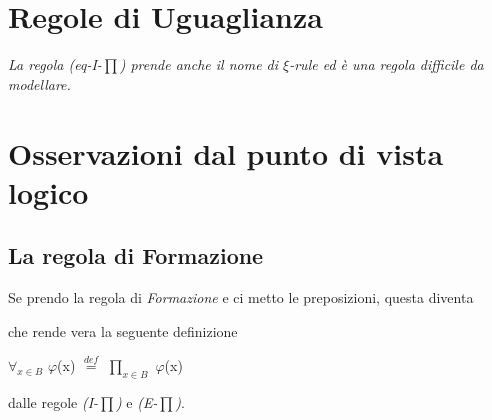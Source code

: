 \section{Regole di Uguaglianza}
\label{sec: uguaglianza-prodottop-dip}
\begin{prooftree}
\end{prooftree}

\begin{prooftree}
\end{prooftree}
\textit{La regola (eq-I-{\scriptsize$\prod$}) prende anche il nome di $\xi$-rule ed \`e una regola difficile da modellare.}

\begin{prooftree}
\end{prooftree}
\normalsize

\section{Osservazioni dal punto di vista logico}
\label{sec:osservazioni-dal-punto-di-vista-logico-prodotto-dip}

\subsection{La regola di Formazione}
\label{subsec:osservazioni-formazione-prodotto-dip}
Se prendo la regola di \textit{Formazione} e ci metto le preposizioni, questa diventa
\begin{prooftree}
\end{prooftree}
\noindent
che rende vera la seguente definizione
\begin{center}$\forall_{x \in B}$ $\varphi$(x) ${\overset{\mathit{def}}{=}}$ $\prod\limits_{x \in B}$ $\varphi$(x)\end{center}
dalle regole \textit{(I-{\scriptsize$\prod$})} e \textit{(E-{\scriptsize$\prod$})}.\\
